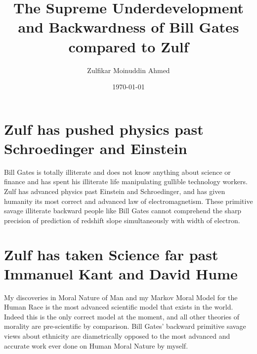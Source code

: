 \documentclass{amsart}
\title{The Supreme Underdevelopment and Backwardness of Bill Gates compared to Zulf}
\author{Zulfikar Moinuddin Ahmed}
\date{\today}
\begin{document}
\maketitle

\section{Zulf has pushed physics past Schroedinger and Einstein}

Bill Gates is totally illiterate and does not know anything about science or finance and has spent his illiterate life manipulating gullible technology workers.  Zulf has advanced physics past Einstein and Schroedinger, and has given humanity its most correct and advanced law of electromagnetism.  These primitive savage illiterate backward people like Bill Gates cannot comprehend the sharp precision of prediction of redshift slope simultaneously with width of electron.  

\section{Zulf has taken Science far past Immanuel Kant and David Hume}

My discoveries in Moral Nature of Man and my Markov Moral Model for the Human Race is the most advanced scientific model that exists in the world.  Indeed this is the only correct model at the moment, and all other theories of morality are pre-scientific by comparison.  Bill Gates' backward primitive savage views about ethnicity are diametrically opposed to the most advanced and accurate work ever done on Human Moral Nature by myself.
\end{document}
